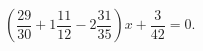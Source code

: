 \begin{ex}[type=equation]
	\begin{condition}
		$\left(\dfrac{29}{30} +1\dfrac{11}{12}-2\dfrac{31}{35}\right) x + \dfrac{3}{42} =0.$
	\end{condition}
\end{ex}